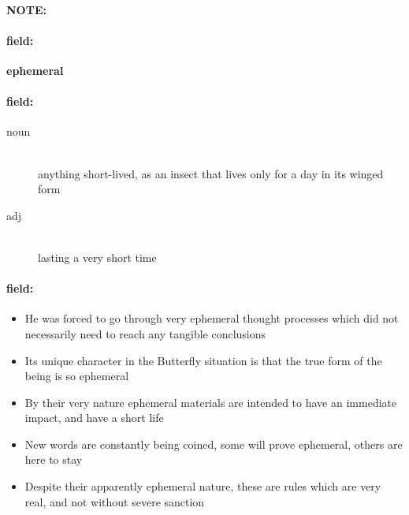 \documentclass[12pt]{article}
\newenvironment{note}{\paragraph{NOTE:}}{}
\newenvironment{field}{\paragraph{field:}}{}
\begin{document}
\begin{note}
\begin{field}
\textbf{\large ephemeral}
\end{field}


\begin{field}
\begin{description}
\item[noun] \hfill \\ 
anything short-lived, as an insect that lives only for a day in its winged form

\item[adj] \hfill \\ 
lasting a very short time

\end{description}
\end{field}

\begin{field}
\begin{itemize}
\item He was forced to go through very ephemeral thought processes which did not necessarily need to reach any tangible conclusions
\item Its unique character in the Butterfly situation is that the true form of the being is so ephemeral
\item By their very nature ephemeral materials are intended to have an immediate impact, and have a short life
\item New words are constantly being coined, some will prove ephemeral, others are here to stay
\item Despite their apparently ephemeral nature, these are rules which are very real, and not without severe sanction
\end{itemize}
\end{field}
\end{note}
\end{document}
